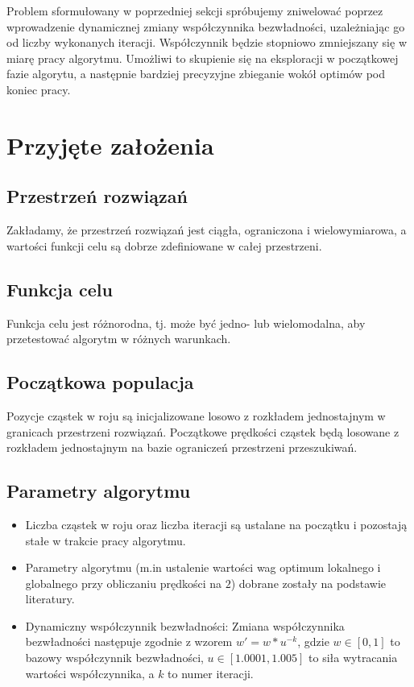 \documentclass[12pt]{article}
\begin{document}
Problem sformułowany w poprzedniej sekcji spróbujemy zniwelować poprzez wprowadzenie dynamicznej zmiany współczynnika bezwładności,
uzależniając go od liczby wykonanych iteracji. Współczynnik będzie stopniowo zmniejszany się w miarę pracy algorytmu.
Umożliwi to skupienie się na eksploracji w początkowej fazie algorytu, a następnie bardziej precyzyjne
zbieganie wokół optimów pod koniec pracy.

\section{Przyjęte założenia}

\subsection*{Przestrzeń rozwiązań}
Zakładamy, że przestrzeń rozwiązań jest ciągła, ograniczona i wielowymiarowa, a wartości funkcji celu są dobrze zdefiniowane w całej przestrzeni.

\subsection*{Funkcja celu}
Funkcja celu jest różnorodna, tj. może być jedno- lub wielomodalna, aby przetestować algorytm w różnych warunkach.

\subsection*{Początkowa populacja}
Pozycje cząstek w roju są inicjalizowane losowo z rozkładem jednostajnym w granicach przestrzeni rozwiązań. Początkowe prędkości cząstek będą losowane z rozkładem jednostajnym na bazie ograniczeń przestrzeni przeszukiwań.

\subsection*{Parametry algorytmu}
\begin{itemize}
	\item{Liczba cząstek w roju oraz liczba iteracji są ustalane na początku i pozostają stałe w trakcie pracy algorytmu.}
	\item{ Parametry algorytmu (m.in ustalenie wartości wag optimum lokalnego i globalnego przy obliczaniu prędkości na \(2\)) dobrane zostały na podstawie literatury. }
	\item{Dynamiczny współczynnik bezwładności: Zmiana współczynnika bezwładności następuje zgodnie z wzorem $w'=w*u^{-k}$, gdzie $w \in [0,1]$ to bazowy współczynnik bezwładności, $u \in [1.0001, 1.005]$ to siła wytracania wartości współczynnika, a $k$ to numer iteracji.}
\end{itemize}
\end{document}
